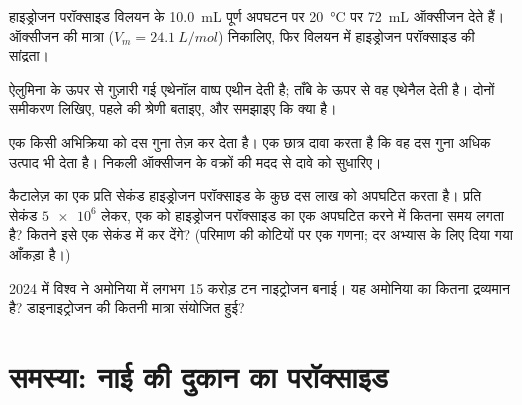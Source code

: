 \begin{exercise}[$\star\star$]\label{exo:g12:catalysis:11}
हाइड्रोजन परॉक्साइड विलयन के \qty{10.0}{mL} पूर्ण अपघटन पर \qty{20}{\celsius} पर
\qty{72}{mL} ऑक्सीजन देते हैं। ऑक्सीजन की मात्रा
($V_m = \qty{24.1}{L/mol}$) निकालिए, फिर विलयन में
हाइड्रोजन परॉक्साइड की सांद्रता।
\end{exercise}

\begin{exercise}[$\star\star\star$]\label{exo:g12:catalysis:12}
ऐलुमिना के ऊपर से गुज़ारी गई एथेनॉल वाष्प एथीन देती है; ताँबे के ऊपर से वह
एथेनैल देती है। दोनों समीकरण लिखिए, पहले की श्रेणी बताइए, और
समझाइए कि  क्या है।
\end{exercise}

\begin{exercise}[$\star\star\star$]\label{exo:g12:catalysis:13}
एक  किसी अभिक्रिया को दस गुना तेज़ कर देता है। एक छात्र दावा करता है कि वह
दस गुना अधिक उत्पाद भी देता है। निकली ऑक्सीजन के वक्रों की मदद से
दावे को सुधारिए।
\end{exercise}

\begin{exercise}[$\star\star\star$]\label{exo:g12:catalysis:14}
कैटालेज़ का एक  प्रति सेकंड हाइड्रोजन परॉक्साइड के कुछ दस लाख
 को अपघटित करता है। प्रति सेकंड $\num{5e6}$ लेकर, एक   को
हाइड्रोजन परॉक्साइड का एक  अपघटित करने में कितना समय लगता है?
कितने   इसे एक सेकंड में कर देंगे? (परिमाण की कोटियों पर एक
गणना; दर अभ्यास के लिए दिया गया आँकड़ा है।)
\end{exercise}

\begin{exercise}[$\star\star\star$]\label{exo:g12:catalysis:15}
2024 में विश्व ने अमोनिया में लगभग 15 करोड़ टन नाइट्रोजन बनाई।
यह अमोनिया का कितना द्रव्यमान है? डाइनाइट्रोजन की कितनी मात्रा संयोजित हुई?
\end{exercise}

\section{समस्या: नाई की दुकान का परॉक्साइड}

